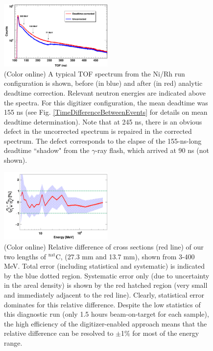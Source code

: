 \documentclass[twocolumn,secnumarabic,amssymb, nobibnotes, aps, prl,
superscriptaddress, nobalancelastpage]{revtex4}
\begin{document}
\begin{figure}
    \includegraphics[width=0.5\textwidth]{figures/CorrectionEffectOnTOF.png}
    \caption{(Color online) A typical TOF spectrum from the Ni/Rh
        run configuration is shown, before (in blue) and after (in red) analytic
        deadtime correction. Relevant neutron energies are indicated above the spectra.
        For this digitizer configuration, the mean deadtime was 155 ns (see Fig.
        \ref{TimeDifferenceBetweenEvents} for details on mean deadtime determination).
        Note that at 245 ns, there is an
        obvious defect in the uncorrected spectrum is repaired in the corrected
        spectrum. The defect
        corresponds to the elapse of the 155-ns-long deadtime ``shadow" from the $\gamma$-ray
        flash, which arrived at 90 ns (not shown).
    }
    \label{CorrectionEffectOnTOF}
\end{figure}

\begin{figure}
    \includegraphics[width=0.5\textwidth]{figures/relativeDiff_longCarbonShortCarbon.png}
    \caption{(Color online) Relative difference of cross sections (red line) of
        our two lengths of $^{\text{nat}}$C, (27.3 mm and 13.7 mm), shown from 3-400
        MeV. Total error
        (including statistical and systematic) is indicated by the blue
        dotted region. Systematic error only (due to uncertainty in the areal
        density) is shown by the red hatched region (very small and immediately adjacent to 
        the red line). Clearly, statistical error dominates for this relative
        difference.
        Despite the low statistics of this diagnostic run (only 1.5 hours
        beam-on-target for each sample), the high efficiency of the
        digitizer-enabled approach means that the relative difference can be resolved to 
        $\pm$1\% for most of the energy range.
    }
    \label{CarbonBenchmarking}
\end{figure}
\end{document}
